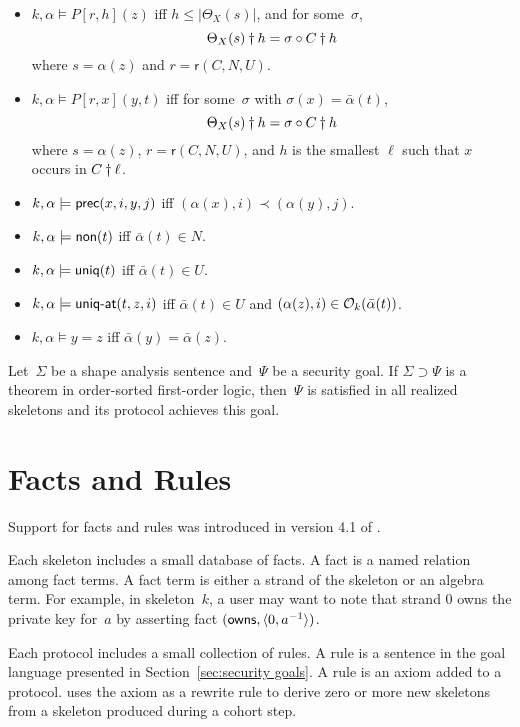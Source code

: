 \documentclass[12pt]{report}
\theoremstyle{definition}
\newcommand{\role}{\mathsf{r}}
\begin{document}
\begin{itemize}
\item $k,\alpha\models P[r,h](z)$ iff $h\leq|\Theta_X(s)|$, and for
  some~$\sigma$,
  \[\Theta_X(s)\dagger h=\sigma\circ C\dagger h\]
  where $s=\alpha(z)$ and $r=\role(C,N,U)$.

\item $k,\alpha\models P[r,x](y,t)$ iff
  for some~$\sigma$ with $\sigma(x)=\bar\alpha(t)$,
  \[\Theta_X(s)\dagger h=\sigma\circ C\dagger h\]
  where $s=\alpha(z)$, $r=\role(C,N,U)$, and $h$ is the smallest
  $\ell$ such that $x$ occurs in $C\dagger\ell$.

\item $k,\alpha\models\operatorname{\mathsf{prec}}(x,i,y,j)$ iff
  $(\alpha(x),i)\prec(\alpha(y),j)$.
\item $k,\alpha\models\operatorname{\mathsf{non}}(t)$ iff $\bar\alpha(t)\in N$.
\item $k,\alpha\models\operatorname{\mathsf{uniq}}(t)$ iff $\bar\alpha(t)\in U$.
\item $k,\alpha\models\operatorname{\mathsf{\mbox{\sf uniq-at}}}(t,z,i)$ iff $\bar\alpha(t)\in U$ and
  $(\alpha(z),i)\in\mathcal{O}_k(\bar\alpha(t))$.
\item $k,\alpha\models y=z$ iff $\bar\alpha(y)=\bar\alpha(z)$.
\end{itemize}

Let~$\Sigma$ be a shape analysis sentence and~$\Psi$ be a security
goal.  If $\Sigma\supset\Psi$ is a theorem in order-sorted first-order
logic, then~$\Psi$ is satisfied in all realized skeletons and its
protocol achieves this goal.

\chapter{Facts and Rules}\label{chp:facts and rules}

Support for facts and rules was introduced in version 4.1 of {\cpsa}.

Each skeleton includes a small database of facts.  A fact is a named
relation among fact terms.  A fact term is either a
strand of the skeleton or an algebra term.  For example, in
skeleton~$k$, a user may want to note that strand 0 owns the private
key for~$a$ by asserting fact $(\operatorname{\mathsf{owns}},\langle0, a^{-1}\rangle)$.

Each protocol includes a small collection of rules.  A rule is a
sentence in the goal language presented in Section~\ref{sec:security
  goals}.  A rule is an axiom added to a protocol.  {\cpsa} uses the
axiom as a rewrite rule to derive zero or more new skeletons from a
skeleton produced during a cohort step.




\printindex
\end{document}
